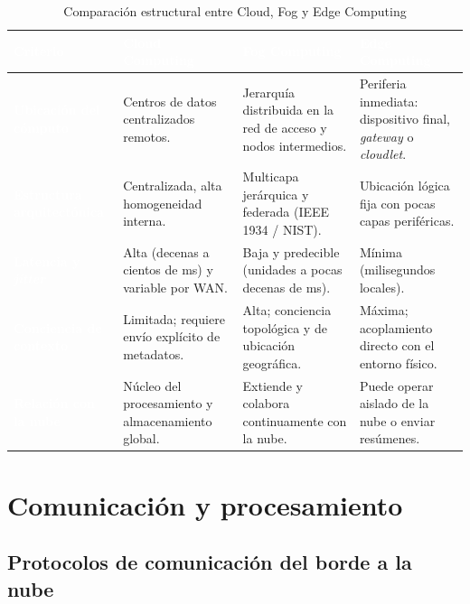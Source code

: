 \documentclass[12pt, letterpaper]{article}
\begin{document}
\begin{table}[H]
\centering
\small
\caption{Comparación estructural entre Cloud, Fog y Edge Computing}
\label{tab:comparativa_paradigmas}
\renewcommand{\arraystretch}{1.25}
\begin{tabular}{|m{3.1cm}|m{3.8cm}|m{4.0cm}|m{3.8cm}|}
    \hline
    \rowcolor{MidnightBlue!80}
    \textcolor{white}{\textbf{Criterio}} & \textcolor{white}{\textbf{Cloud Computing}} & \textcolor{white}{\textbf{Fog Computing}} & \textcolor{white}{\textbf{Edge Computing}} \\
    \hline
    \cellcolor{MidnightBlue!40}\textcolor{white}{\textbf{Ubicación del cómputo}} & Centros de datos centralizados remotos. & Jerarquía distribuida en la red de acceso y nodos intermedios. & Periferia inmediata: dispositivo final, \textit{gateway} o \textit{cloudlet}. \\
    \hline
    \cellcolor{MidnightBlue!40}\textcolor{white}{\textbf{Estructura arquitectónica}} & Centralizada, alta homogeneidad interna. & Multicapa jerárquica y federada (IEEE 1934 / NIST). & Ubicación lógica fija con pocas capas periféricas. \\
    \hline
    \cellcolor{MidnightBlue!40}\textcolor{white}{\textbf{Latencia y \textit{jitter}}} & Alta (decenas a cientos de ms) y variable por WAN. & Baja y predecible (unidades a pocas decenas de ms). & Mínima (milisegundos locales). \\
    \hline
    \cellcolor{MidnightBlue!40}\textcolor{white}{\textbf{Conciencia de contexto}} & Limitada; requiere envío explícito de metadatos. & Alta; conciencia topológica y de ubicación geográfica. & Máxima; acoplamiento directo con el entorno físico. \\
    \hline
    \cellcolor{MidnightBlue!40}\textcolor{white}{\textbf{Relación con la nube}} & Núcleo del procesamiento y almacenamiento global. & Extiende y colabora continuamente con la nube. & Puede operar aislado de la nube o enviar resúmenes. \\
    \hline
\end{tabular}
\end{table}

\section{Comunicación y procesamiento}

\subsection{Protocolos de comunicación del borde a la nube}
\end{document}
